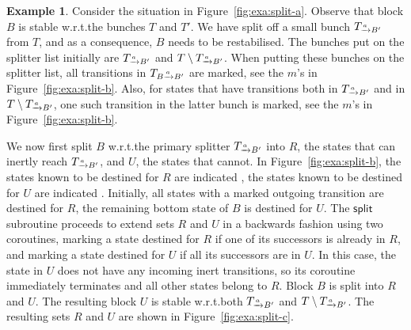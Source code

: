 \documentclass[a4paper,10pt]{article}
\theoremstyle{definition}
\newtheorem{example}[definition]{Example}
\theoremstyle{plain}
\newcommand{\pijl}[1]{\mathrel{\text{$\xrightarrow{\smash[t]{#1}}$}}}
\newcommand{\TBaB}{T_{B\pijl{a} B'}}
\newcommand{\TaB}{T_{\pijl{a} B'}}
\newlength{\statetextwidth}\settowidth{\statetextwidth}{$s_0$}
\newcommand{\redstatetext}{\smash{\tikz[baseline=-0.37\statetextwidth]{\node[red state,thin,inner sep=0pt]{\makebox[0.5\statetextwidth]{}};}}}
\newcommand{\bluestatetext}{\smash{\tikz[baseline=-0.37\statetextwidth]{\node[blue state,thin,inner sep=0pt]{\makebox[0.5\statetextwidth]{}};}}}
\begin{document}
\begin{example}\label{exa:split}
Consider the situation in Figure~\ref{fig:exa:split-a}.
Observe that block $B$ is stable w.r.t.\@ the bunches $T$ and $T'$.
We have split off a small bunch $\TaB$ from $T$, and as a consequence, $B$ needs to be restabilised.
The bunches put on the splitter list initially are $\TaB$ and $T \setminus \TaB$.
When putting these bunches on the splitter list, all transitions in $\TBaB$ are marked, see the {\color{red}$m$}'s in Figure~\ref{fig:exa:split-b}.
Also, for states that have transitions both in $\TaB$ and in $T \setminus \TaB$,
one such transition in the latter bunch is marked, see the {\color{gray}$m$}'s in Figure~\ref{fig:exa:split-b}.

We now first split $B$ w.r.t.\@ the primary splitter $\TaB$ into $R$, the states that can inertly reach $\TaB$, and $U$, the states that cannot. In Figure~\ref{fig:exa:split-b}, the states known to be destined for $R$ are indicated \redstatetext, the states known to be destined for $U$ are indicated \bluestatetext.
Initially, all states with a marked outgoing transition are destined for $R$, the remaining bottom state of $B$ is destined for $U$.
The $\mathsf{split}$ subroutine proceeds to extend sets $R$ and $U$ in a backwards fashion using two coroutines, marking a state destined for $R$ if one of its successors is already in $R$, and marking a state destined for $U$ if all its successors are in $U$.
In this case, the state in $U$ does not have any incoming inert transitions, so its coroutine immediately terminates and all other states belong to $R$. Block $B$ is split into $R$ and $U$.
The resulting block $U$ is stable w.r.t.\@ both $\TaB$ and $T \setminus \TaB$. The resulting sets $R$ and $U$ are shown in Figure~\ref{fig:exa:split-c}.


\end{example}
\end{document}
